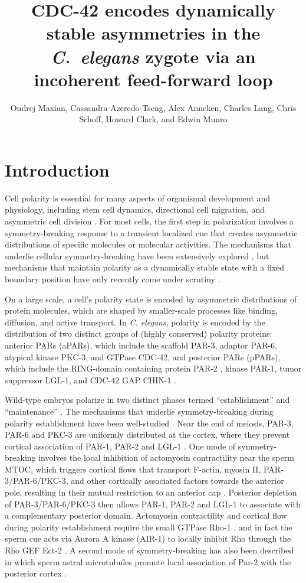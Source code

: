 \documentclass[11pt]{article}
\title{CDC-42 encodes dynamically stable asymmetries in the \emph{C.\ elegans} zygote via an incoherent feed-forward loop}
\author{Ondrej Maxian, Cassandra Azeredo-Tseng, Alex Anneken, Charles Lang, Chris Schoff, Howard Clark, and Edwin Munro \vspace{-0.75 cm}}
\newcommand{\6}[1]{#1_{\text{6}}}
\newcommand{\3}[1]{#1_{\text{3}}}
\begin{document}
\maketitle

\section*{Introduction}
Cell polarity is essential for many aspects of organismal development and physiology, including stem cell dynamics, directional cell migration, and asymmetric cell division \citep{dewey2015cell, goldstein2007proteins, ierushalmi2021cytoskeletal, maitre2016asymmetric}. For most cells, the first step in polarization involves a symmetry-breaking response to a transient localized cue that creates asymmetric distributions of specific molecules or molecular activities. The mechanisms that underlie cellular symmetry-breaking have been extensively explored \citep{li2010symmetry}, but mechanisms that maintain polarity as a dynamically stable state with a fixed boundary position have only recently come under scrutiny \citep{sailer2015dynamic, gross2019guiding}.

On a large scale, a cell's polarity state is encoded by asymmetric distributions of protein molecules, which are shaped by smaller-scale processes like binding, diffusion, and active transport. In \emph{C. elegans}, polarity is encoded by the distribution of two distinct groups of (highly conserved) polarity proteins: anterior PARs (aPARs), which include the scaffold PAR-3, adaptor PAR-6, atypical kinase PKC-3, and GTPase CDC-42, and posterior PARs (pPARs), which include the RING-domain containing protein PAR-2 \citep{bland2023optimized}, kinase PAR-1, tumor suppressor LGL-1, and CDC-42 GAP CHIN-1 \citep{lang2017proteins}. 

Wild-type embryos polarize in two distinct phases termed ``establishment'' and ``maintenance'' \citep{cuenca2003polarization}. The mechanisms that underlie symmetry-breaking during polarity establishment have been well-studied \citep{cowan2007acto, munro2009cellular}.  Near the end of meiosis, PAR-3, PAR-6 and PKC-3 are uniformly distributed at the cortex, where they prevent cortical association of PAR-1, PAR-2 and LGL-1 \citep{schonegg2006cdc, others}.  One mode of symmetry-breaking involves the local inhibition of actomyosin contractility near the sperm MTOC, which triggers cortical flows that transport F-actin, myosin II, PAR-3/PAR-6/PKC-3, and other cortically associated factors towards the anterior pole, resulting in their mutual restriction to an anterior cap \citep{munro2004cortical, rodriguez2017apkc}. Posterior depletion of PAR-3/PAR-6/PKC-3 then allows PAR-1, PAR-2 and LGL-1 to associate with a complementary posterior domain.  Actomyosin contractility and cortical flow during polarity establishment require the small GTPase Rho-1 \citep{schonegg2006cdc, motegi2006sequential}, and in fact the sperm cue acts via Aurora A kinase (AIR-1) to locally inhibit Rho through the Rho GEF Ect-2 \citep{motegi2006sequential, tse2012rhoa, longhini2022aurora, kapoor2019centrosome}.  A second mode of symmetry-breaking has also been described in which sperm astral microtubules promote local association of Par-2 with the posterior cortex \citep{motegi2011microtubules}.
\end{document}
